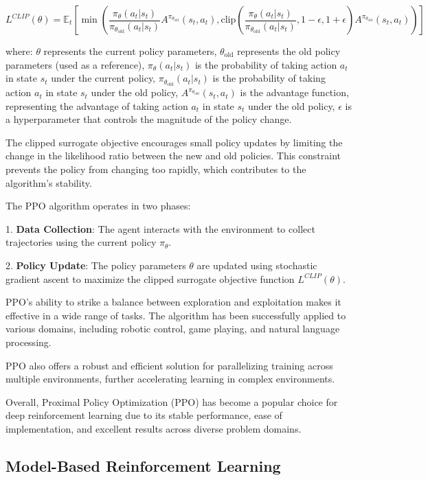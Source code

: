 \[L^{CLIP}(\theta) = \mathbb{E}_{t} \left[ \min \left( \frac{\pi_{\theta}(a_t|s_t)}{\pi_{\theta_{\text{old}}}(a_t|s_t)} A^{\pi_{\theta_{\text{old}}}}(s_t, a_t), \text{clip}\left( \frac{\pi_{\theta}(a_t|s_t)}{\pi_{\theta_{\text{old}}}(a_t|s_t)}, 1-\epsilon, 1+\epsilon \right) A^{\pi_{\theta_{\text{old}}}}(s_t, a_t) \right) \right]\]

where:
\(\theta\) represents the current policy parameters,
\(\theta_{\text{old}}\) represents the old policy parameters (used as a reference),
\(\pi_{\theta}(a_t|s_t)\) is the probability of taking action \(a_t\) in state \(s_t\) under the current policy,
\(\pi_{\theta_{\text{old}}}(a_t|s_t)\) is the probability of taking action \(a_t\) in state \(s_t\) under the old policy,
\(A^{\pi_{\theta_{\text{old}}}}(s_t, a_t)\) is the advantage function, representing the advantage of taking action \(a_t\) in state \(s_t\) under the old policy,
\(\epsilon\) is a hyperparameter that controls the magnitude of the policy change.

The clipped surrogate objective encourages small policy updates by limiting the change in the likelihood ratio between the new and old policies. This constraint prevents the policy from changing too rapidly, which contributes to the algorithm's stability.

The PPO algorithm operates in two phases:

1.
\textbf{Data Collection}: The agent interacts with the environment to collect trajectories using the current policy \(\pi_{\theta}\).

2.
\textbf{Policy Update}: The policy parameters \(\theta\) are updated using stochastic gradient ascent to maximize the clipped surrogate objective function \(L^{CLIP}(\theta)\).

PPO's ability to strike a balance between exploration and exploitation makes it effective in a wide range of tasks. The algorithm has been successfully applied to various domains, including robotic control, game playing, and natural language processing.

PPO also offers a robust and efficient solution for parallelizing training across multiple environments, further accelerating learning in complex environments.

Overall, Proximal Policy Optimization (PPO) has become a popular choice for deep reinforcement learning due to its stable performance, ease of implementation, and excellent results across diverse problem domains.

\subsection{Model-Based Reinforcement Learning}

